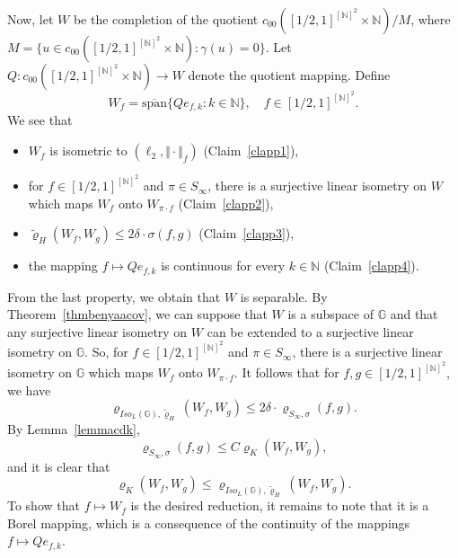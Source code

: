 \documentclass[a4paper]{amsart}
\theoremstyle{plain}
\theoremstyle{remark}
\begin{document}
Now, let $ W $ be the completion of the quotient $ c_{00}([1/2, 1]^{[\mathbb{N}]^{2}} \times \mathbb{N}) / M $, where $ M = \{ u \in c_{00}([1/2, 1]^{[\mathbb{N}]^{2}} \times \mathbb{N}) : \gamma(u) = 0 \} $. Let $ Q : c_{00}([1/2, 1]^{[\mathbb{N}]^{2}} \times \mathbb{N}) \to W $ denote the quotient mapping. Define
$$ W_{f} = \overline{\mathrm{span}} \{ Qe_{f, k} : k \in \mathbb{N} \}, \quad f \in [1/2, 1]^{[\mathbb{N}]^{2}}. $$
We see that
\begin{itemize}
\item $ W_{f} $ is isometric to $ (\ell_{2}, \Vert \cdot \Vert_{f}) $ (Claim~\ref{clapp1}),
\item for $ f \in [1/2, 1]^{[\mathbb{N}]^{2}} $ and $ \pi \in S_{\infty} $, there is a surjective linear isometry on $ W $ which maps $ W_{f} $ onto $  W_{\pi \cdot f} $ (Claim~\ref{clapp2}),
\item $ \tilde{\varrho}_{H}(W_{f}, W_{g}) \leq 2 \delta \cdot \sigma(f, g) $ (Claim~\ref{clapp3}),
\item the mapping $ f \mapsto Qe_{f, k} $ is continuous for every $ k \in \mathbb{N} $ (Claim~\ref{clapp4}).
\end{itemize}

From the last property, we obtain that $ W $ is separable. By Theorem~\ref{thmbenyaacov}, we can suppose that $ W $ is a subspace of $ \mathbb{G} $ and that any surjective linear isometry on $ W $ can be extended to a surjective linear isometry on $ \mathbb{G} $. So, for $ f \in [1/2, 1]^{[\mathbb{N}]^{2}} $ and $ \pi \in S_{\infty} $, there is a surjective linear isometry on $ \mathbb{G} $ which maps $ W_{f} $ onto $  W_{\pi \cdot f} $. It follows that for $ f, g \in [1/2, 1]^{[\mathbb{N}]^{2}} $, we have
$$ \varrho_{Iso_{L}(\mathbb{G}), \tilde{\varrho}_{H}}(W_{f}, W_{g}) \leq 2 \delta \cdot \varrho_{S_{\infty}, \sigma}(f, g). $$
By Lemma~\ref{lemmacdk}, 
$$ \varrho_{S_{\infty}, \sigma}(f, g) \leq C \varrho_{K}(W_{f}, W_{g}), $$
and it is clear that
$$ \varrho_{K}(W_{f}, W_{g}) \leq \varrho_{Iso_{L}(\mathbb{G}), \tilde{\varrho}_{H}}(W_{f}, W_{g}). $$
To show that $ f \mapsto W_{f} $ is the desired reduction, it remains to note that it is a Borel mapping, which is a consequence of the continuity of the mappings $ f \mapsto Qe_{f, k} $.
\end{document}
